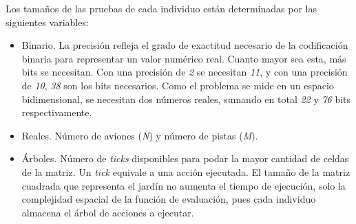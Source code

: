 		
				
		Los tamaños de las pruebas de cada individuo están determinadas por las siguientes variables:
		
		\begin{itemize}
			\item Binario. La precisión refleja el grado de exactitud necesario de la codificación binaria para representar un valor numérico real. Cuanto mayor sea esta, más bits se necesitan. Con una precisión de \textit{2} se necesitan \textit{11}, y con una precisión de \textit{10}, \textit{38} son los bits necesarios. Como el problema se mide en un espacio bidimensional, se necesitan dos números reales, sumando en total \textit{22} y \textit{76} bits respectivamente. 
			\item Reales. Número de aviones (\textit{N}) y número de pistas (\textit{M}).
			\item Árboles. Número de \textit{ticks} disponibles para podar la mayor cantidad de celdas de la matriz. Un \textit{tick} equivale a una acción ejecutada. El tamaño de la matriz cuadrada que representa el jardín no aumenta el tiempo de ejecución, solo la complejidad espacial de la función de evaluación, pues cada individuo almacena el árbol de acciones a ejecutar.
		\end{itemize}
		
